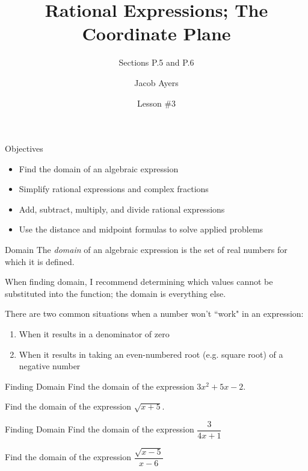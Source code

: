 \documentclass{beamer}
\title[P.5 and P.6]{Rational Expressions; The Coordinate Plane}
\subtitle{Sections P.5 and P.6}
\author{Jacob Ayers}
\institute{MAT 130} %
\date{Lesson \#3} %
\begin{document}
\begin{frame}
\titlepage
\end{frame}

\begin{frame}[t]{Objectives}
\begin{itemize}
	\item Find the domain of an algebraic expression
	\item Simplify rational expressions and complex fractions
	\item Add, subtract, multiply, and divide rational expressions
	\item Use the distance and midpoint formulas to solve applied problems
\end{itemize}
\end{frame}

\begin{frame}[t]{Domain}
The \textit{domain} of an algebraic expression is the set of real numbers for which it is defined. \vspace{6pt}

\pause

When finding domain, I recommend determining which values cannot be substituted into the function; the domain is everything else. \vspace{6pt}

\pause

There are two common situations when a number won't ``work" in an expression: \vspace{-4pt} \begin{enumerate}[1)]
\item When it results in a denominator of zero
\item When it results in taking an even-numbered root (e.g. square root) of a negative number
\end{enumerate}
\end{frame}

\begin{frame}[t]{Finding Domain}
Find the domain of the expression $3x^2 + 5x - 2$.

\pause \vfill

Find the domain of the expression $\sqrt{x+5}$.
\end{frame}

\begin{frame}[t]{Finding Domain}
Find the domain of the expression $\dfrac{3}{4x + 1}$

\pause \vfill

Find the domain of the expression $\dfrac{\sqrt{x-5}}{x-6}$
\end{frame}
\end{document}
